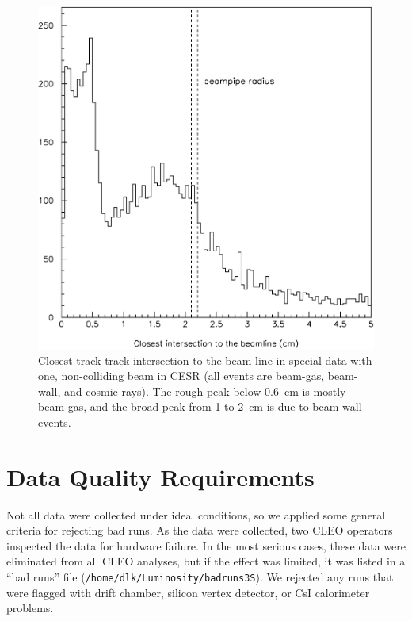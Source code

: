 \documentclass{cornell}
\begin{document}
\begin{figure}[p]
  \begin{center}
    \includegraphics[width=\linewidth]{plots/smallbeamwall}
  \end{center}
  \caption[Relative magnitudes of beam-gas, beam-wall, and cosmic
  rays]{\label{smallbeamwall} Closest track-track intersection to the
  beam-line in special data with one, non-colliding beam in CESR (all
  events are beam-gas, beam-wall, and cosmic rays).  The rough peak
  below 0.6~cm is mostly beam-gas, and the broad peak from 1 to 2~cm
  is due to beam-wall events.}
\end{figure}

\section{Data Quality Requirements}
\label{sec:quality}

Not all data were collected under ideal conditions, so we applied some
general criteria for rejecting bad runs.  As the data were collected,
two CLEO operators inspected the data for hardware failure.  In the
most serious cases, these data were eliminated from all CLEO analyses,
but if the effect was limited, it was listed in a ``bad runs'' file
({\tt /home/dlk/Luminosity/badruns3S}).  We rejected any runs that
were flagged with drift chamber, silicon vertex detector, or CsI
calorimeter problems.
\end{document}
